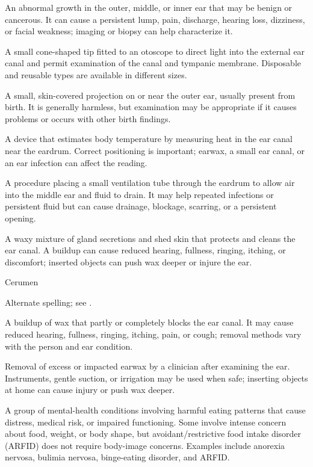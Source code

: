  An abnormal growth in the outer, middle, or inner ear that may be benign or cancerous. It can cause a persistent lump, pain, discharge, hearing loss, dizziness, or facial weakness; imaging or biopsy can help characterize it.

 A small cone-shaped tip fitted to an otoscope to direct light into the external ear canal and permit examination of the canal and tympanic membrane. Disposable and reusable types are available in different sizes.

 A small, skin-covered projection on or near the outer ear, usually present from birth. It is generally harmless, but examination may be appropriate if it causes problems or occurs with other birth findings.

 A device that estimates body temperature by measuring heat in the ear canal near the eardrum. Correct positioning is important; earwax, a small ear canal, or an ear infection can affect the reading.

 A procedure placing a small ventilation tube through the eardrum to allow air into the middle ear and fluid to drain. It may help repeated infections or persistent fluid but can cause drainage, blockage, scarring, or a persistent opening.

 A waxy mixture of gland secretions and shed skin that protects and cleans the ear canal. A buildup can cause reduced hearing, fullness, ringing, itching, or discomfort; inserted objects can push wax deeper or injure the ear.

\synonyms
Cerumen

 Alternate spelling; see .

 A buildup of wax that partly or completely blocks the ear canal. It may cause reduced hearing, fullness, ringing, itching, pain, or cough; removal methods vary with the person and ear condition.

 Removal of excess or impacted earwax by a clinician after examining the ear. Instruments, gentle suction, or irrigation may be used when safe; inserting objects at home can cause injury or push wax deeper.

 A group of mental-health conditions involving harmful eating patterns that cause distress, medical risk, or impaired functioning. Some involve intense concern about food, weight, or body shape, but avoidant/restrictive food intake disorder (ARFID) does not require body-image concerns. Examples include anorexia nervosa, bulimia nervosa, binge-eating disorder, and ARFID.

